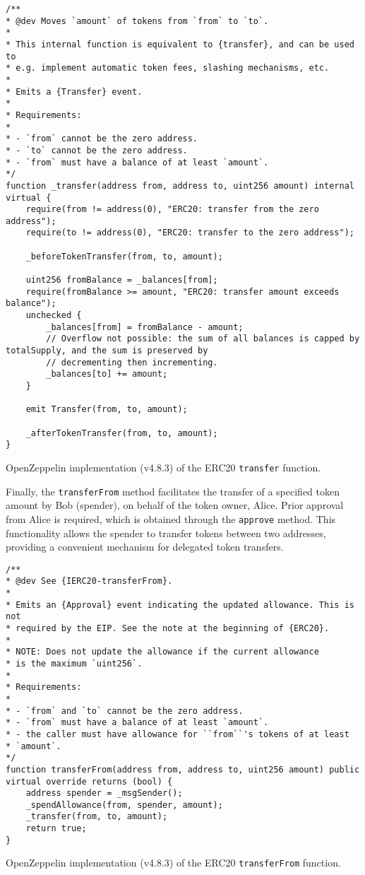 \begin{listing}[!ht]
    \begin{verbatim}
/**
* @dev Moves `amount` of tokens from `from` to `to`.
*
* This internal function is equivalent to {transfer}, and can be used to
* e.g. implement automatic token fees, slashing mechanisms, etc.
*
* Emits a {Transfer} event.
*
* Requirements:
*
* - `from` cannot be the zero address.
* - `to` cannot be the zero address.
* - `from` must have a balance of at least `amount`.
*/
function _transfer(address from, address to, uint256 amount) internal virtual {
    require(from != address(0), "ERC20: transfer from the zero address");
    require(to != address(0), "ERC20: transfer to the zero address");

    _beforeTokenTransfer(from, to, amount);

    uint256 fromBalance = _balances[from];
    require(fromBalance >= amount, "ERC20: transfer amount exceeds balance");
    unchecked {
        _balances[from] = fromBalance - amount;
        // Overflow not possible: the sum of all balances is capped by totalSupply, and the sum is preserved by
        // decrementing then incrementing.
        _balances[to] += amount;
    }

    emit Transfer(from, to, amount);

    _afterTokenTransfer(from, to, amount);
}
    \end{verbatim}
    \caption{OpenZeppelin implementation (v4.8.3) of the ERC20 \texttt{transfer} function.}
    \label{lst:openzeppelin_transfer}
\end{listing}

Finally, the \texttt{transferFrom} method facilitates the transfer of a specified token amount by Bob (spender), on behalf of the token owner, Alice. Prior approval 
from Alice is required, which is obtained through the \texttt{approve} method. This functionality allows the spender to transfer tokens between two addresses, providing a convenient 
mechanism for delegated token transfers.

\begin{listing}[H]
    \begin{verbatim}
/**
* @dev See {IERC20-transferFrom}.
*
* Emits an {Approval} event indicating the updated allowance. This is not
* required by the EIP. See the note at the beginning of {ERC20}.
*
* NOTE: Does not update the allowance if the current allowance
* is the maximum `uint256`.
*
* Requirements:
*
* - `from` and `to` cannot be the zero address.
* - `from` must have a balance of at least `amount`.
* - the caller must have allowance for ``from``'s tokens of at least
* `amount`.
*/
function transferFrom(address from, address to, uint256 amount) public virtual override returns (bool) {
    address spender = _msgSender();
    _spendAllowance(from, spender, amount);
    _transfer(from, to, amount);
    return true;
}
    \end{verbatim}
    \caption{OpenZeppelin implementation (v4.8.3) of the ERC20 \texttt{transferFrom} function.}
    \label{lst:openzeppelin_transferFrom}
\end{listing}


